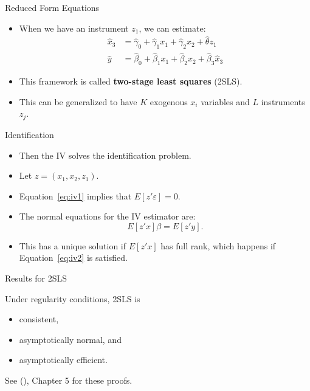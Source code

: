 \documentclass[handout]{beamer} %
\begin{document}
\begin{frame}{Reduced Form Equations}

\begin{itemize}
    \item When we have an instrument $z_1$, we can estimate:
      \begin{align*}
        \hat x_3 &= \hat \gamma_0 + \hat \gamma_1 x_1 + \hat \gamma_2 x_2 
          + \hat \theta z_1\\
        \hat y &= \hat \beta_0 + \hat \beta_1 x_1 + \hat \beta_2 x_2 + \hat
        \beta_3 \hat x_3
      \end{align*}
    \item This framework is called \textbf{two-stage least squares} (2SLS).
    \item This can be generalized to have $K$ exogenous $x_i$ variables and $L$
      instruments $z_j$.
\end{itemize}

\end{frame}

\begin{frame}{Identification}

\begin{itemize}
    \item Then the IV solves the identification problem.
    \item Let $z = (x_1, x_2, z_1)$.
    \item Equation~\ref{eq:iv1} implies that $E[z' \varepsilon] = 0$.
    \item The normal equations for the IV estimator are:
      \[E[z'x]\beta = E[z'y].\]
    \item This has a unique solution if $E[z'x]$ has full rank, which happens if
      Equation~\ref{eq:iv2} is satisfied.
\end{itemize}

\end{frame}

\begin{frame}{Results for 2SLS}

Under regularity conditions, 2SLS is
\begin{itemize}
  \item consistent,
  \item asymptotically normal, and 
  \item asymptotically efficient.
\end{itemize}

  See (\cite{wooldridge2010econometric}), Chapter 5 for these proofs.

\end{frame}
\end{document}
